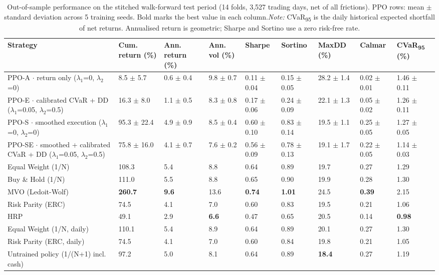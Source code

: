 \documentclass[11pt]{article}
\begin{document}
\begin{table}[!htbp]
\centering\scriptsize
\caption{Out-of-sample performance on the stitched walk-forward test period (14 folds, 3,527 trading days, net of all frictions). PPO rows: mean $\pm$ standard deviation across 5 training seeds. Bold marks the best value in each column.\label{tab-main-no} \emph{Note:} CVaR\textsubscript{95} is the daily historical expected shortfall of net returns. Annualised return is geometric; Sharpe and Sortino use a zero risk-free rate.}
\begin{adjustbox}{max width=\linewidth}
\begin{tabular}{@{}lllllllll@{}}
\toprule
Strategy & Cum. return (\%) & Ann. return (\%) & Ann. vol (\%) & Sharpe & Sortino & MaxDD (\%) & Calmar & CVaR\textsubscript{95} (\%) \\
\midrule
PPO-A $\cdot$ return only {($\lambda_1$=0, $\lambda_2$=0)} & 8.5{ $\pm$ 5.7} & 0.6{ $\pm$ 0.4} & 9.8{ $\pm$ 0.7} & 0.11{ $\pm$ 0.04} & 0.15{ $\pm$ 0.05} & 28.2{ $\pm$ 1.4} & 0.02{ $\pm$ 0.01} & 1.46{ $\pm$ 0.11} \\
PPO-E $\cdot$ calibrated CVaR + DD {($\lambda_1$=0.05, $\lambda_2$=0.5)} & 16.3{ $\pm$ 8.0} & 1.1{ $\pm$ 0.5} & 8.3{ $\pm$ 0.8} & 0.17{ $\pm$ 0.06} & 0.24{ $\pm$ 0.09} & 22.1{ $\pm$ 1.3} & 0.05{ $\pm$ 0.02} & 1.26{ $\pm$ 0.11} \\
PPO-S $\cdot$ smoothed execution {($\lambda_1$=0, $\lambda_2$=0)} & 95.3{ $\pm$ 22.4} & 4.9{ $\pm$ 0.9} & 8.5{ $\pm$ 0.4} & 0.60{ $\pm$ 0.10} & 0.83{ $\pm$ 0.14} & 19.5{ $\pm$ 1.1} & 0.25{ $\pm$ 0.05} & 1.27{ $\pm$ 0.05} \\
PPO-SE $\cdot$ smoothed + calibrated CVaR + DD {($\lambda_1$=0.05, $\lambda_2$=0.5)} & 75.8{ $\pm$ 16.0} & 4.1{ $\pm$ 0.7} & 7.6{ $\pm$ 0.2} & 0.56{ $\pm$ 0.09} & 0.78{ $\pm$ 0.13} & 19.1{ $\pm$ 1.7} & 0.22{ $\pm$ 0.05} & 1.14{ $\pm$ 0.03} \\
Equal Weight (1/N) & 108.3 & 5.4 & 8.8 & 0.64 & 0.89 & 19.7 & 0.27 & 1.29 \\
Buy \& Hold (1/N) & 111.0 & 5.5 & 8.8 & 0.65 & 0.90 & 19.9 & 0.28 & 1.30 \\
MVO (Ledoit-Wolf) & \textbf{260.7} & \textbf{9.6} & 13.6 & \textbf{0.74} & \textbf{1.01} & 24.5 & \textbf{0.39} & 2.15 \\
Risk Parity (ERC) & 74.5 & 4.1 & 7.0 & 0.60 & 0.83 & 19.5 & 0.21 & 1.06 \\
HRP & 49.1 & 2.9 & \textbf{6.6} & 0.47 & 0.65 & 20.5 & 0.14 & \textbf{0.98} \\
Equal Weight (1/N, daily) & 110.1 & 5.4 & 8.9 & 0.64 & 0.89 & 20.1 & 0.27 & 1.30 \\
Risk Parity (ERC, daily) & 74.5 & 4.1 & 7.0 & 0.60 & 0.84 & 19.8 & 0.21 & 1.05 \\
Untrained policy (1/(N+1) incl. cash) & 97.2 & 5.0 & 8.1 & 0.64 & 0.89 & \textbf{18.4} & 0.27 & 1.19 \\
\bottomrule
\end{tabular}
\end{adjustbox}
\end{table}
\end{document}
